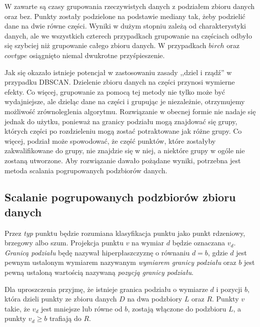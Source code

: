 
W  zawarte są czasy grupowania rzeczywistych danych z podziałem zbioru danych oraz bez. Punkty zostały podzielone na podstawie mediany tak, żeby podzielić dane na dwie równe części. Wyniki w dużym stopniu zależą od charakterystyki danych, ale we wszystkich czterech przypadkach grupowanie na częściach odbyło się szybciej niż grupowanie całego zbioru danych. W przypadkach $ birch $ oraz $ covtype $ osiągnięto niemal dwukrotne przyśpieszenie.\par
Jak się okazało istnieje potencjał w zastosowaniu zasady ,,dziel i rządź'' w przypadku DBSCAN. Dzielenie zbioru danych na części przynosi wymierne efekty. Co więcej, grupowanie za pomocą tej metody nie tylko może być wydajniejsze, ale dzieląc dane na części i grupując je niezależnie, otrzymujemy możliwość zrównoleglenia algorytmu. Rozwiązanie w obecnej formie nie nadaje się jednak do użytku, ponieważ na granicy podziału mogą znajdować się grupy, których części po rozdzieleniu mogą zostać potraktowane jak różne grupy. Co więcej, podział może spowodować, że  część punktów, które zostałyby zakwalifikowane do grupy, nie znajdzie się w niej, a niektóre grupy w ogóle nie zostaną utworzone. Aby rozwiązanie dawało pożądane wyniki, potrzebna jest metoda scalania pogrupowanych podzbiorów danych.

\subsection{Scalanie pogrupowanych podzbiorów zbioru danych}
Przez \textit{typ} punktu będzie rozumiana klasyfikacja punktu jako punkt rdzeniowy, brzegowy albo szum. Projekcja punktu $ v $ na wymiar $ d $ będzie oznaczana $ v_d $. \textit{Granicą podziału} będę nazywał hiperpłaszczyznę o równaniu $ d=b $, gdzie $ d $ jest pewnym ustalonym wymiarem nazywanym \textit{wymiarem granicy podziału} oraz $ b $ jest pewną ustaloną wartością nazywaną \textit{pozycją granicy podziału}.

Dla uproszczenia przyjmę, że istnieje granica podziału o wymiarze $ d $ i pozycji $ b $, która dzieli punkty ze zbioru danych $ D $ na dwa podzbiory $ L $ oraz $ R $. Punkty $ v $ takie, że $ v_d $ jest mniejsze lub równe od $ b $, zostają włączone do podzbioru $ L $, a punkty $ v_d \ge b $ trafiają do $ R $.



